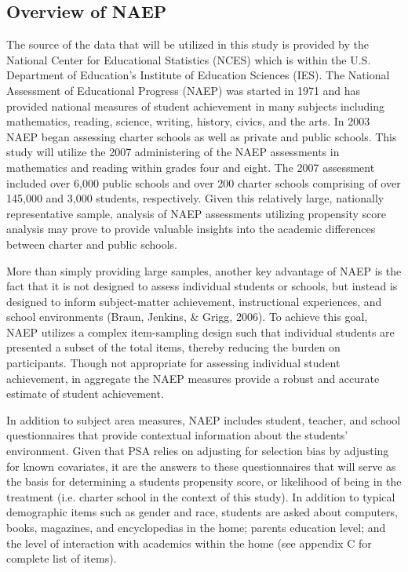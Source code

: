 \documentclass[letterpaper,12p,twoside]{article} %
\begin{document}
\subsection{Overview of NAEP}
The source of the data that will be utilized in this study is provided by the National Center for Educational Statistics (NCES) which is within the U.S. Department of Education's Institute of Education Sciences (IES). The National Assessment of Educational Progress (NAEP) was started in 1971 and has provided national measures of student achievement in many subjects including mathematics, reading, science, writing, history, civics, and the arts. In 2003 NAEP began assessing charter schools as well as private and public schools. This study will utilize the 2007 administering of the NAEP assessments in mathematics and reading within grades four and eight. The 2007 assessment included over 6,000 public schools and over 200 charter schools comprising of over 145,000 and 3,000 students, respectively. Given this relatively large, nationally representative sample, analysis of NAEP assessments utilizing propensity score analysis may prove to provide valuable insights into the academic differences between charter and public schools.

More than simply providing large samples, another key advantage of NAEP is the fact that it is not designed to assess individual students or schools, but instead is designed to inform subject-matter achievement, instructional experiences, and school environments (Braun, Jenkins, \& Grigg, 2006). To achieve this goal, NAEP utilizes a complex item-sampling design such that individual students are presented a subset of the total items, thereby reducing the burden on participants. Though not appropriate for assessing individual student achievement, in aggregate the NAEP measures provide a robust and accurate estimate of student achievement.

In addition to subject area measures, NAEP includes student, teacher, and school questionnaires that provide contextual information about the students' environment. Given that PSA relies on adjusting for selection bias by adjusting for known covariates, it are the answers to these questionnaires that will serve as the basis for determining a students propensity score, or likelihood of being in the treatment (i.e. charter school in the context of this study). In addition to typical demographic items such as gender and race, students are asked about computers, books, magazines, and encyclopedias in the home; parents education level; and the level of interaction with academics within the home (see appendix C for complete list of items).
\end{document}
